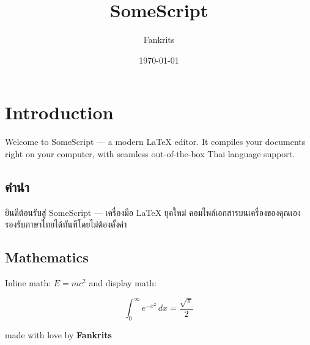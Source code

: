 \documentclass[12pt, a4paper]{article}
\title{SomeScript}
\author{Fankrits}
\date{\today}
\begin{document}
\maketitle

\section*{Introduction}

Welcome to SomeScript — a modern LaTeX editor. It compiles your documents right on your computer, with seamless out-of-the-box Thai language support.

\subsection*{คำนำ}
ยินดีต้อนรับสู่ SomeScript — เครื่องมือ LaTeX ยุคใหม่ คอมไพล์เอกสารบนเครื่องของคุณเอง รองรับภาษาไทยได้ทันทีโดยไม่ต้องตั้งค่า
\subsection*{Mathematics}
Inline math: $E = mc^2$ and display math:

\[
\int_{0}^{\infty} e^{-x^{2}}\,dx = \frac{\sqrt{\pi}}{2}
\]

\vspace{1cm}

\begin{center}
made with love by \textbf{Fankrits}
\end{center}
\end{document}
